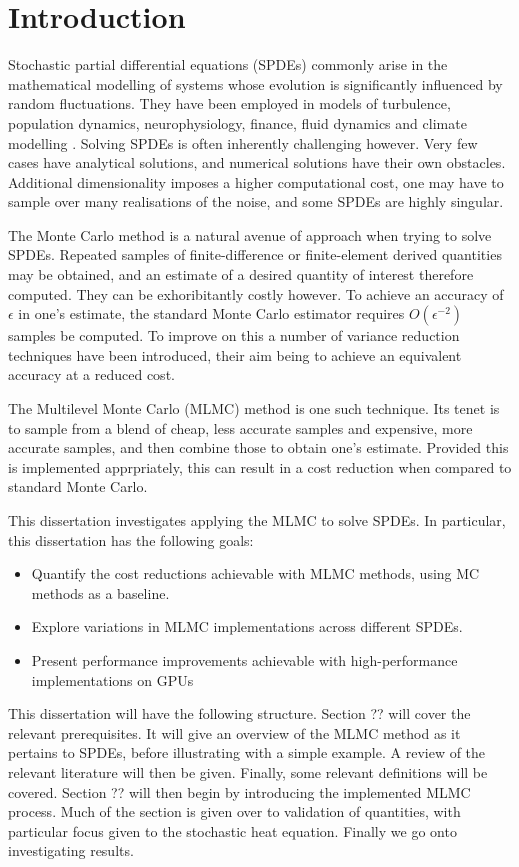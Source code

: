 \section{Introduction}

Stochastic partial differential equations (SPDEs) commonly arise in the mathematical modelling of systems 
whose evolution is significantly influenced by random fluctuations. They have been employed in models of turbulence,
population dynamics, neurophysiology, finance, fluid dynamics and climate modelling \cite{pardoux2021stochastic}
\cite{alonso2020modelling}. Solving SPDEs is often inherently challenging however. Very few cases have analytical
solutions, and numerical solutions have their own obstacles.
Additional dimensionality imposes a higher computational cost, one may have to 
sample over many realisations of the noise, and some SPDEs are highly singular.

The Monte Carlo method is a natural avenue of approach when trying to solve SPDEs. Repeated samples of 
finite-difference or finite-element derived quantities may be obtained, and an estimate of a 
desired quantity of interest therefore computed. They can be exhoribitantly costly however. To achieve an 
accuracy of $\epsilon$ in one's estimate, the standard Monte Carlo
estimator requires $O(\epsilon^{-2})$ samples be computed. To improve on this a number
of variance reduction techniques have been introduced, their aim being to achieve an equivalent accuracy 
at a reduced cost.

The Multilevel Monte Carlo (MLMC) method is one such technique. Its tenet is to sample from a blend of 
cheap, less accurate samples and expensive, more accurate samples, and then combine those to obtain 
one's estimate. Provided this is implemented apprpriately, this can result in a cost reduction when compared
to standard Monte Carlo. 

This dissertation investigates applying the MLMC to solve SPDEs. In particular,
this dissertation has the following goals:
\begin{itemize}
    \item Quantify the cost reductions achievable with MLMC methods, using MC methods as a baseline.
    \item Explore variations in MLMC implementations across different SPDEs.
    \item Present performance improvements achievable with high-performance implementations on GPUs
\end{itemize}


This dissertation will have the following structure. Section ?? will cover the relevant prerequisites. It will 
give an overview of the MLMC method as it pertains to SPDEs, before illustrating with a simple example. A review 
of the relevant literature will then be given. Finally, some relevant definitions will be covered. Section ??
will then begin by introducing the implemented MLMC process. Much of the section is given over to validation 
of quantities, with particular focus given to the stochastic heat equation. Finally we go onto investigating results.

